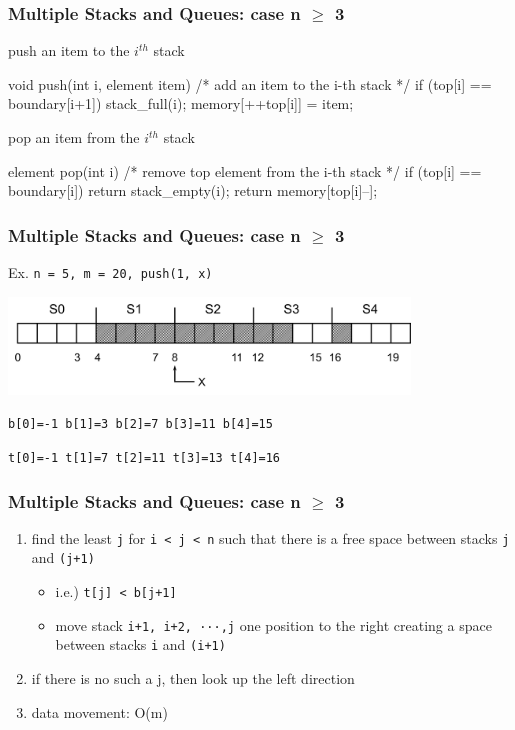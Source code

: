 \documentclass[newPxFont,sthlmFooter,nooffset]{beamer}
\begin{document}
\begin{frame}[t, fragile]
  \frametitle{Multiple Stacks and Queues: case n $\geq$ 3}
push an item to the $i^{th}$ stack
\begin{ncodedef}
void push(int i, element item) { 
    /* add an item to the i-th stack */
    if (top[i] == boundary[i+1]) 
        stack_full(i);
    memory[++top[i]] = item; 
}    
\end{ncodedef}
\bigskip
pop an item from the $i^{th}$ stack
\begin{ncodedef}
element pop(int i) {
    /* remove top element from the i-th stack */
    if (top[i] == boundary[i]) 
        return stack_empty(i);
    return memory[top[i]--]; 
}
\end{ncodedef}
\end{frame}

\begin{frame}[t]
  \frametitle{Multiple Stacks and Queues: case n $\geq$ 3}
Ex. \texttt{n = 5, m = 20, push(1, x)}

\begin{center}
  \includegraphics[width=0.8\textwidth]{figures/fig10_ex.png}
\end{center}
\bigskip
\texttt{b[0]=-1 b[1]=3 b[2]=7 b[3]=11 b[4]=15}

\texttt{t[0]=-1 t[1]=7 t[2]=11 t[3]=13 t[4]=16}
\end{frame}

\begin{frame}[t]
  \frametitle{Multiple Stacks and Queues: case n $\geq$ 3}
  \begin{enumerate}
  \item find the least \texttt{j} for \texttt{i < j < n} such that there is a free space between stacks \texttt{j} and \texttt{(j+1)}
    \begin{itemize}
    \item i.e.) \texttt{t[j] < b[j+1]}
    \item move stack \texttt{i+1, i+2, ···,j} one position to the
      right creating a space between stacks \texttt{i} and
      \texttt{(i+1)}
    \end{itemize}
  \item if there is no such a j, then look up the left direction
  \item data movement: O(m)
  \end{enumerate}
\end{frame}
\end{document}
